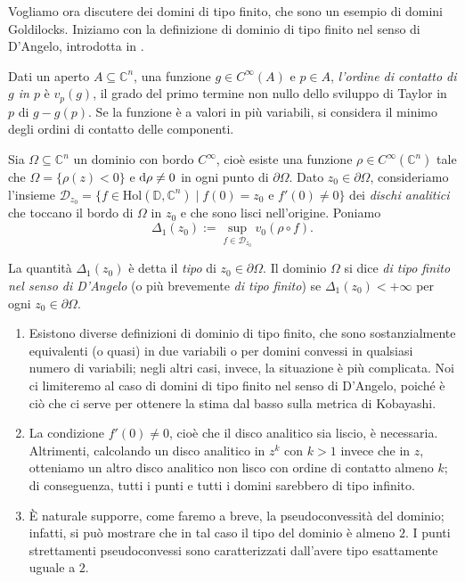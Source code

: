 Vogliamo ora discutere dei domini di tipo finito, che sono un esempio di domini Goldilocks. Iniziamo con la definizione di dominio di tipo finito nel senso di D'Angelo, introdotta in \cite{D'A}.

\begin{defn}
    Dati un aperto $A\subseteq\mathbb{C}^n$, una funzione $g\in C^\infty(A)$ e $p\in A$, \textit{l'ordine di contatto di $g$ in $p$} è $v_p(g)$, il grado del primo termine non nullo dello sviluppo di Taylor in $p$ di $g-g(p)$. Se la funzione è a valori in più variabili, si considera il minimo degli ordini di contatto delle componenti.

    Sia $\Omega\subseteq\mathbb{C}^n$ un dominio con bordo $C^\infty$, cioè esiste una funzione $\rho\in C^\infty(\mathbb{C}^n)$ tale che $\Omega=\{\rho(z)<0\}$ e $\mathop{}\!\mathrm{d}\rho\not=0$ in ogni punto di $\partial\Omega$. Dato $z_0\in\partial\Omega$, consideriamo l'insieme $\mathcal{D}_{z_0}=\{f\in\text{Hol}(\mathbb{D},\mathbb{C}^n)\mid f(0)=z_0\text{ e }f'(0)\not=0\}$ dei \textit{dischi analitici} che toccano il bordo di $\Omega$ in $z_0$ e che sono lisci nell'origine. Poniamo
    $$\Delta_1(z_0):=\sup_{f\in\mathcal{D}_{z_0}} v_0(\rho\circ f).$$

    La quantità $\Delta_1(z_0)$ è detta il \textit{tipo} di $z_0\in\partial\Omega$. Il dominio $\Omega$ si dice \textit{di tipo finito nel senso di D'Angelo} (o più brevemente \textit{di tipo finito}) se $\Delta_1(z_0)<+\infty$ per ogni $z_0\in\partial\Omega$.
\end{defn}

\begin{oss}
    \begin{enumerate}
        \item Esistono diverse definizioni di dominio di tipo finito, che sono sostanzialmente equivalenti (o quasi) in due variabili o per domini convessi in qualsiasi numero di variabili; negli altri casi, invece, la situazione è più complicata. Noi ci limiteremo al caso di domini di tipo finito nel senso di D'Angelo, poiché è ciò che ci serve per ottenere la stima dal basso sulla metrica di Kobayashi.
        \item La condizione $f'(0)\not=0$, cioè che il disco analitico sia liscio, è necessaria. Altrimenti, calcolando un disco analitico in $z^k$ con $k>1$ invece che in $z$, otteniamo un altro disco analitico non lisco con ordine di contatto almeno $k$; di conseguenza, tutti i punti e tutti i domini sarebbero di tipo infinito.
        \item È naturale supporre, come faremo a breve, la pseudoconvessità del dominio; infatti, si può mostrare che in tal caso il tipo del dominio è almeno $2$. I punti strettamenti pseudoconvessi sono caratterizzati dall'avere tipo esattamente uguale a $2$.
    \end{enumerate}
\end{oss}

